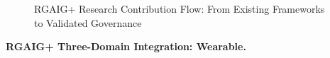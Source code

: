 \begin{figure}[!htbp]
{}
\caption[RGAIG+ Research Contribution Flow]{RGAIG+ Research Contribution Flow: From Existing Frameworks to Validated Governance}
\label{fig:rgaig_contribution_flow}
\end{figure}

\vspace{1.5em}

\noindent\textbf{RGAIG+ Three-Domain Integration: Wearable.}

